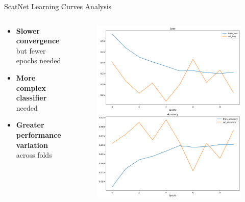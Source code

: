 \documentclass[aspectratio=169,8pt]{beamer}  %
\begin{document}
\begin{frame}{ScatNet Learning Curves Analysis}
\begin{columns}[T]
\begin{column}{0.5\textwidth}
\begin{itemize}
\item \textbf{Slower convergence} but fewer epochs needed
\item \textbf{More complex classifier} needed
\item \textbf{Greater performance variation} across folds
\end{itemize}
\end{column}
\begin{column}{0.5\textwidth}
\begin{figure}
\includegraphics[width=\textwidth, height=0.9\textwidth]{imgs/scatnet_train.png}
\end{figure}
\end{column}
\end{columns}
\end{frame}
\end{document}
